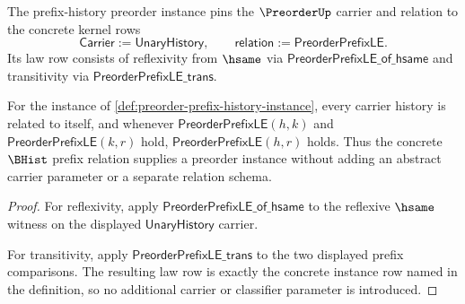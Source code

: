 \begin{definition}
\label{def:preorder-prefix-history-instance}
The prefix-history preorder instance pins the $\PreorderUp$ carrier and relation to the concrete kernel rows
$$
\mathsf{Carrier}:=\mathsf{UnaryHistory},
\qquad
\mathsf{relation}:=\mathsf{PreorderPrefixLE}.
$$
Its law row consists of reflexivity from $\hsame$ via $\mathsf{PreorderPrefixLE\_of\_hsame}$ and transitivity via $\mathsf{PreorderPrefixLE\_trans}$.
\end{definition}

\begin{theorem}
\label{thm:preorder-prefix-history-laws}
For the instance of \autoref{def:preorder-prefix-history-instance}, every carrier history is related to itself, and whenever $\mathsf{PreorderPrefixLE}(h,k)$ and $\mathsf{PreorderPrefixLE}(k,r)$ hold, $\mathsf{PreorderPrefixLE}(h,r)$ holds. Thus the concrete $\BHist$ prefix relation supplies a preorder instance without adding an abstract carrier parameter or a separate relation schema.
\end{theorem}
\begin{proof}
For reflexivity, apply $\mathsf{PreorderPrefixLE\_of\_hsame}$ to the reflexive $\hsame$ witness on the displayed $\mathsf{UnaryHistory}$ carrier.

For transitivity, apply $\mathsf{PreorderPrefixLE\_trans}$ to the two displayed prefix comparisons. The resulting law row is exactly the concrete instance row named in the definition, so no additional carrier or classifier parameter is introduced.
\end{proof}
